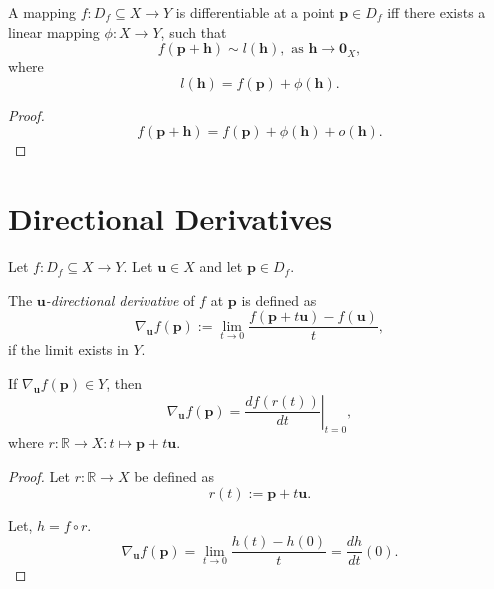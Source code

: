 \documentclass{article}
\begin{document}
\begin{proposition}
	A mapping $f: D_f \subseteq X \to Y$ is differentiable at a point $\mathbf p \in D_f$ iff there exists a linear mapping $\phi: X \to Y$, such that
	$$
	f(\mathbf p + \mathbf h) \sim l(\mathbf h), \text{ as $\mathbf h \to \mathbf 0_{X}$},
	$$
	where
	$$
	l(\mathbf h) = f(\mathbf p) + \phi(\mathbf h).
	$$
	
	\begin{proof}
		$$
		f(\mathbf p + \mathbf h) = f(\mathbf p) + \phi(\mathbf h) + o(\mathbf h).
		$$
	\end{proof}
\end{proposition}



\section{Directional Derivatives}

\begin{definition}
	Let $f: D_f \subseteq X \to Y$.
	Let $\mathbf u \in X$ and let $\mathbf p \in D_f$.
	
	The \textit{$\mathbf u$-directional derivative} of $f$ at $\mathbf p$ is defined as
	$$
	\nabla_{\mathbf u} f(\mathbf p) := \lim_{t \to 0} \frac{f(\mathbf p + t\mathbf u) - f(\mathbf u)}{t},
	$$
	if the limit exists in $Y$.
\end{definition}


\begin{proposition}
	If $\nabla_{\mathbf u} f(\mathbf p) \in Y$, then
	$$
	\nabla_{\mathbf u} f(\mathbf p) = \left. \frac{df(r(t))}{dt} \right|_{t = 0},
	$$
	where $r:\mathbb R \to X: t \mapsto \mathbf p + t\mathbf u$.
	
	\begin{proof}
		Let $r: \mathbb R \to X$ be defined as
		$$
		r(t) := \mathbf p + t \mathbf u.
		$$
		
		Let, $h = f \circ r$.
		$$
		\nabla_{\mathbf u} f(\mathbf p) = \lim_{t \to 0} \frac{h(t) - h(0)}{t} = \frac{dh}{dt}(0).
		$$
	\end{proof}
\end{proposition}
\end{document}
